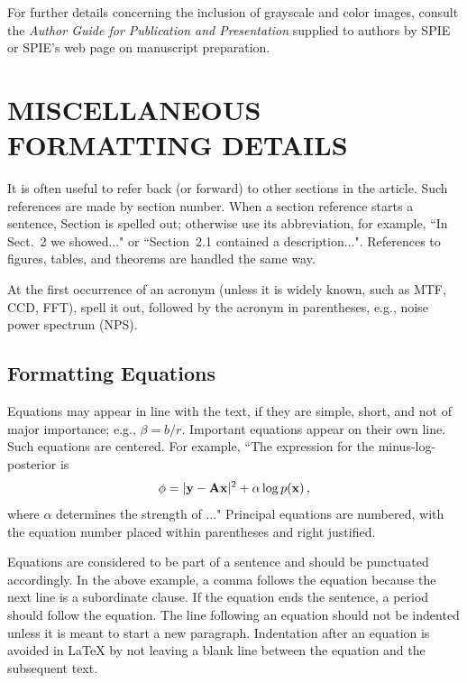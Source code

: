 \documentclass[]{spie}  %
\begin{document}
{F}or further details concerning the inclusion of grayscale and color images, consult the {\it Author Guide for Publication and Presentation} supplied to authors by SPIE or SPIE's web page on manuscript preparation.
 
\appendix    %
\section{MISCELLANEOUS FORMATTING DETAILS} \label{sect:misc}

It is often useful to refer back (or forward) to other sections in the article.  Such references are made by section number.  When a section reference starts a sentence, Section is spelled out; otherwise use its abbreviation, for example, ``In Sect.~2 we showed..." or ``Section~2.1 contained a description...".  References to figures, tables, and theorems are handled the same way.

At the first occurrence of an acronym (unless it is widely known, such as MTF, CCD, FFT), spell it out, followed by the acronym in parentheses, e.g., noise power spectrum (NPS).  
 
\subsection{Formatting Equations} 
Equations may appear in line with the text, if they are simple, short, and not of major importance; e.g., $\beta = b/r$.  Important equations appear on their own line.  Such equations are centered.  For example, ``The expression for the minus-log-posterior is
    \begin{equation}
    \label{eq:alpha}
\phi = |{\rm\bf y} - {\rm\bf A}{\rm\bf x}|^2 + \alpha \log p({\rm\bf x}) \, ,
    \end{equation}
where $\alpha$ determines the strength of ..."  Principal equations are numbered, with the equation number placed within parentheses and right justified.  

Equations are considered to be part of a sentence and should be punctuated accordingly. In the above example, a comma follows the equation because the next line is a subordinate clause.  If the equation ends the sentence, a period should follow the equation.  The line following an equation should not be indented unless it is meant to start a new paragraph.  Indentation after an equation is avoided in LaTeX by not leaving a blank line between the equation and the subsequent text.
\end{document}
